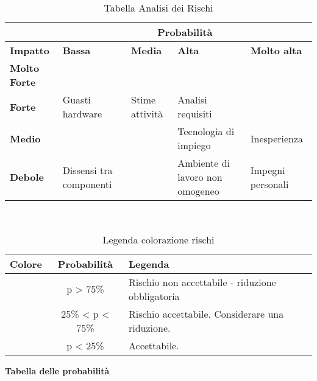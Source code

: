 \documentclass{scalatekids-article}
\begin{document}
\begin{table}[H]
  \centering
  \scriptsize
  \caption{Tabella Analisi dei Rischi}
  \begin{tabular}{|m{1cm}|m{3cm}|m{3cm}|m{3cm}|m{3cm}|}
    \hline
    & \multicolumn{4}{|c|}{\textbf{Probabilità}}\\
    \hline
    \bf Impatto & \bf Bassa & \bf Media & \bf Alta & \textbf{Molto alta} \\
    \hline
    \bf Molto Forte & \cellcolor{red!50} & \cellcolor{red!50} & \cellcolor{red!50} &\cellcolor{red!50} \\
    \hline
    \bf Forte & \cellcolor{yellow!50}Guasti hardware & \cellcolor{yellow!50}Stime attività & \cellcolor{red!50}Analisi requisiti &\cellcolor{red!50}\\[8pt]
    \hline
    \bf Medio & \cellcolor{green!50} & \cellcolor{yellow!50} &\cellcolor{yellow!50}Tecnologia di impiego &\cellcolor{red!50}Inesperienza \\[8pt]
    \hline
    \bf Debole & \cellcolor{green!50}Dissensi tra componenti & \cellcolor{green!50} &\cellcolor{yellow!50}Ambiente di lavoro non omogeneo &\cellcolor{yellow!50}Impegni personali \\
    \hline
  \end{tabular} \\
\end{table}
\begin{table}[H]
  \centering
  \caption{Legenda colorazione rischi}
  \begin{tabular}{|c|c|l|}
    \hline \bf Colore & \bf Probabilità & \bf Legenda \\
    \hline \cellcolor{red! 50} & p > 75\% & Rischio non accettabile - riduzione obbligatoria \\
    \hline \cellcolor{yellow! 50} & 25\% < p < 75\% & Rischio accettabile. Considerare una riduzione. \\
    \hline \cellcolor{green! 50} & p < 25\% & Accettabile. \\
    \hline
  \end{tabular}
\end{table}
\fi
\textbf{Tabella delle probabilità}
\end{document}
